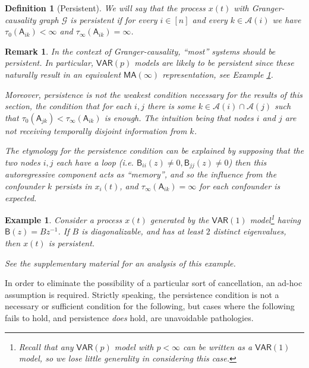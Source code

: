\documentclass{statsoc}
\def\gcg{\mathcal{G}}  %
\def\VAR{\mathsf{VAR}}  %
\def\B{\mathsf{B}}  %
\def\A{\mathsf{A}}  %
\newcommand{\anc}[1]{\mathcal{A}(#1)}  %
\newtheorem{remark}{Remark}
\newtheorem{definition}{Definition}
\newtheorem{example}{Example}
\begin{document}
\begin{definition}[Persistent]
  We will say that the process $x(t)$ with Granger-causality graph
  $\gcg$ is \textit{persistent} if for every $i \in [n]$ and every
  $k \in \anc{i}$ we have $\tau_0(\A_{ik}) < \infty$ and $\tau_\infty(\A_{ik}) = \infty$.
\end{definition}

\begin{remark}
  In the context of Granger-causality, ``most'' systems should be
  persistent.  In particular, $\mathsf{\VAR}(p)$ models are likely to
  be persistent since these naturally result in an equivalent
  $\mathsf{MA}(\infty)$ representation, see Example
  \ref{ex:persistent_system}.

  Moreover, persistence is not the weakest condition necessary for the
  results of this section, the condition that for each $i, j$ there is
  some $k \in \anc{i}\cap\anc{j}$ such that
  $\tau_0(\A_{jk}) < \tau_\infty(\A_{ik})$ is enough.  The intuition
  being that nodes $i$ and $j$ are not receiving temporally disjoint
  information from $k$.

  The etymology for the persistence condition can be explained by
  supposing that the two nodes $i, j$ each have a loop (i.e.
  $\B_{ii}(z) \ne 0, \B_{jj}(z) \ne 0$) then this autoregressive
  component acts as ``memory'', and so the influence from the
  confounder $k$ \textit{persists} in $x_i(t)$, and
  $\tau_\infty(\A_{ik}) = \infty$ for each confounder is expected.
\end{remark}

\begin{example}
  \label{ex:persistent_system}
  Consider a process $x(t)$ generated by the $\VAR(1)$
  model\footnote{Recall that any $\VAR(p)$ model with $p < \infty$ can
    be written as a $\VAR(1)$ model, so we lose little generality in
    considering this case.}  having $\B(z) = Bz^{-1}$.  If $B$ is
  diagonalizable, and has at least $2$ distinct eigenvalues, then
  $x(t)$ is persistent.

  See the supplementary material for an analysis of this example.
\end{example}

In order to eliminate the possibility of a particular sort of
cancellation, an ad-hoc assumption is required.  Strictly speaking,
the persistence condition is not a necessary or sufficient condition
for the following, but cases where the following fails to hold, and
persistence \textit{does} hold, are unavoidable pathologies.
\end{document}
